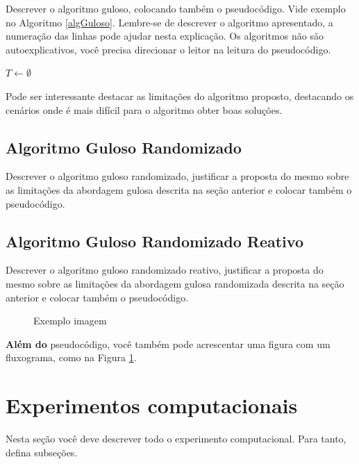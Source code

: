 \documentclass[12pt]{article}
\begin{document}
Descrever o algoritmo guloso, colocando também o pseudocódigo. Vide exemplo no Algoritmo \ref{algGuloso}. Lembre-se de descrever o algoritmo apresentado, a numeração das linhas pode ajudar nesta explicação. Os algoritmos não são autoexplicativos, você precisa direcionar o leitor na leitura do pseudocódigo.

\begin{algorithm}[H]
\caption{Algoritmo Guloso}
\label{algGuloso}

$T \leftarrow \emptyset$\;
\end{algorithm}

Pode ser interessante destacar as limitações do algoritmo proposto, destacando os cenários onde é mais difícil para o algoritmo obter boas soluções. 


\subsection{Algoritmo Guloso Randomizado}
\label{subSecAlgRand}

Descrever o algoritmo guloso randomizado, justificar a proposta do mesmo sobre as limitações da abordagem gulosa descrita na seção anterior e colocar também o pseudocódigo.


\subsection{Algoritmo Guloso Randomizado Reativo}
\label{subSecAlgRandReact}
Descrever o algoritmo guloso randomizado reativo, justificar a proposta do mesmo sobre as limitações da abordagem gulosa randomizada descrita na seção anterior e colocar também o pseudocódigo.

\begin{figure}[ht]
\centering
\resizebox{0.5\textwidth}{!}{
    
}
\caption{Exemplo imagem}
\label{fig:fluxograma}
\end{figure}

\textbf{Além do} pseudocódigo, você também pode acrescentar uma figura com um fluxograma, como na Figura \ref{fig:fluxograma}.




\section{Experimentos computacionais}
\label{secResultados}
Nesta seção você deve descrever todo o experimento computacional. Para tanto, defina subseções.
\end{document}
